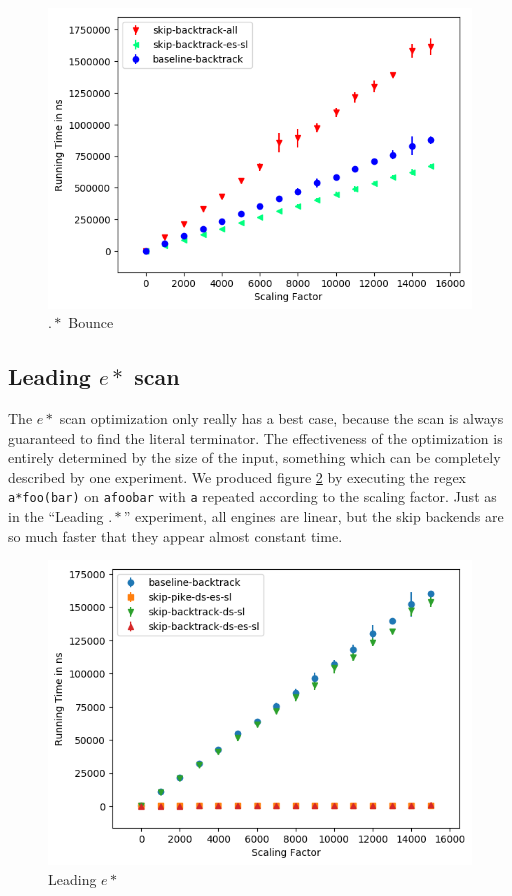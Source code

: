 \begin{figure}
\caption{$.*$ Bounce}
\label{fig:dotstar:bounce}

\includegraphics{resources/dotstar-bounce.png}
\end{figure}

\subsection{Leading $e*$ scan}

The $e*$ scan optimization only really has a best case, because
the scan is always guaranteed to find the literal terminator. The
effectiveness of the optimization is entirely determined by the
size of the input, something which can be completely described
by one experiment. We produced figure \ref{fig:leading:noncontaining:estar}
by executing the regex \verb'a*foo(bar)' on \verb'afoobar' with \verb'a'
repeated according to the scaling factor. 
Just as in the ``Leading $.*$''
experiment, all engines are linear, but the skip backends are so much
faster that they appear almost constant time.

\begin{figure}
\caption{Leading $e*$}
\label{fig:leading:noncontaining:estar}

\includegraphics{resources/leading-noncontaining-estar.png}
\end{figure}

